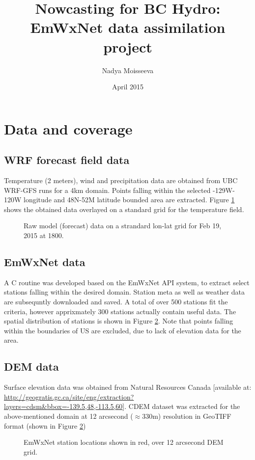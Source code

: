\documentclass{article}
\begin{document}
\title{Nowcasting for BC Hydro: EmWxNet data assimilation project}
\author{Nadya Moisseeva}
\date{April 2015}    %

\maketitle

\tableofcontents

\newpage
\section{Data and coverage}
\subsection{WRF forecast field data}
Temperature (2 meters), wind and precipitation data are obtained from UBC WRF-GFS runs for a 4km domain. Points falling within the selected -129W-120W longitude and 48N-52M latitude bounded area are extracted. Figure \ref{T2raw} shows the obtained data overlayed on a standard grid for the temperature field. 
\begin{figure}
\caption{Raw model (forecast) data on a strandard lon-lat grid for Feb 19, 2015 at 1800.}\label{T2raw}
\end{figure}

\subsection{EmWxNet data}
A C routine was developed based on the EmWxNet API system, to extract select stations falling within the desired domain. Station meta as well as weather data are subsequntly downloaded and saved. A total of over 500 stations fit the criteria, however apprixmately 300 stations actually contain useful data. The spatial distribution of stations is shown in Figure \ref{Domain}. Note that points falling within the boundaries of US are excluded, due to lack of elevation data for the area. 

\subsection{DEM data}
Surface elevation data was obtained from Natural Resources Canada [available at: \url{http://geogratis.gc.ca/site/eng/extraction?layers=cdsm&bbox=-139.5,48,-113.5,60}]. CDEM dataset was extracted for the above-mentioned domain at 12 arcsecond ($\approx$330m) resolution in GeoTIFF format (shown in Figure \ref{Domain})
\begin{figure}
\caption{EmWxNet station locations shown in red, over 12 arcsecond DEM grid.}\label{Domain}
\end{figure}
\end{document}
